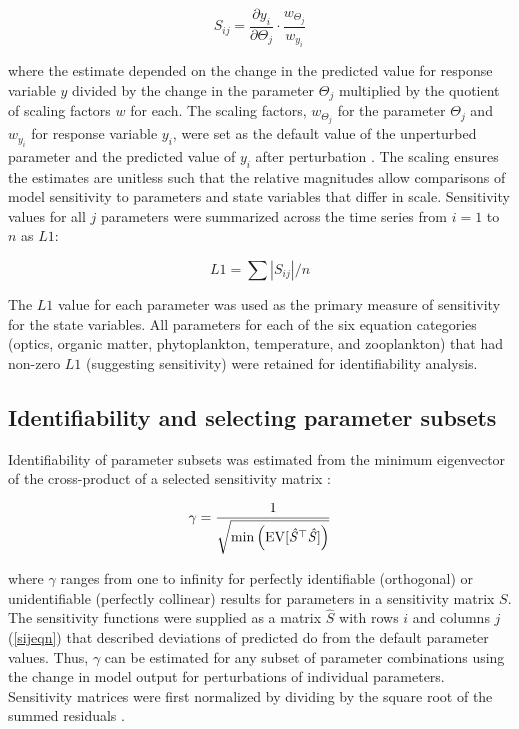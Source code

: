 \documentclass[letterpaper,12pt,oneside]{article}\usepackage[]{graphicx}\usepackage[]{color}
\begin{document}
\begin{equation} \label{sijeqn}
S_{ij} = \frac{\partial y_i}{\partial \Theta_j}\cdot\frac{w_{\Theta_j}}{w_{y_i}}
\end{equation}

\noindent where the estimate depended on the change in the predicted value for response variable $y$ divided by the change in the parameter $\Theta_j$ multiplied by the quotient of scaling factors $w$ for each.  The scaling factors, $w_{\Theta_j}$ for the parameter $\Theta_j$ and $w_{y_i}$ for response variable $y_i$, were set as the default value of the unperturbed parameter and the predicted value of $y_i$ after perturbation \citep{Soetaert10}.  The scaling ensures the estimates are unitless such that the relative magnitudes allow comparisons of model sensitivity to parameters and state variables that differ in scale.  Sensitivity values for all $j$ parameters were summarized across the time series from $i = 1$ to $n$ as $L1$:

\begin{equation} \label{l1}
L1 = \sum|S_{ij}|/n
\end{equation}

The $L1$ value for each parameter was used as the primary measure of sensitivity for the state variables. All parameters for each of the six equation categories (optics, organic matter, phytoplankton, temperature, and zooplankton) that had non-zero $L1$ (suggesting sensitivity) were retained for identifiability analysis.  

\subsection{Identifiability and selecting parameter subsets}

Identifiability of parameter subsets was estimated from the minimum eigenvector of the cross-product of a selected sensitivity matrix \citep{Brun01,Omlin01}:

\begin{equation} \label{gameq}
\gamma = \frac{1} {\sqrt{ \min \left(\rm{EV}[\mathit{\hat{S}}^\top \mathit{\hat{S}}]\right)}}
\end{equation}

\noindent where $\gamma$ ranges from one to infinity for perfectly identifiable (orthogonal) or unidentifiable (perfectly collinear) results for parameters in a sensitivity matrix $S$.  The sensitivity functions were supplied as a matrix $\hat{S}$ with rows $i$ and columns $j$ (\cref{sijeqn}) that described deviations of predicted \ac{do} from the default parameter values.  Thus, $\gamma$ can be estimated for any subset of parameter combinations using the change in model output for perturbations of individual parameters. Sensitivity matrices were first normalized by dividing by the square root of the summed residuals \citep{Omlin01,Soetaert10}. 
\end{document}
